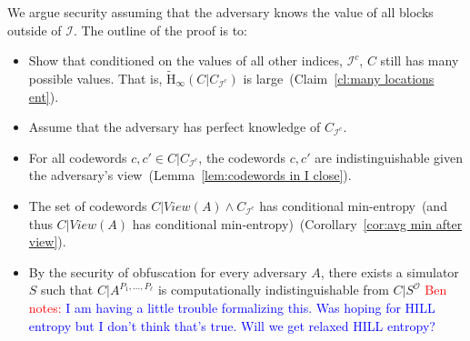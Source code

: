\documentclass[11pt]{article}
\newcommand{\corref}[1]{\mbox{Corollary~\ref{#1}}}
\newcommand{\lemref}[1]{\mbox{Lemma~\ref{#1}}}
\newcommand{\clref}[1]{\mbox{Claim~\ref{#1}}}
\newcommand{\Hav}{\tilde{\mathrm{H}}_\infty}
\newcommand{\authnote}[2]{{\textcolor{red}{\textsf{#1 notes: }\textcolor{blue}{ #2}}\marginpar{\textcolor{red}{\textbf{!!!!!}}}}}
\newcommand{\authnote}[2]{}
\newcommand{\bnote}[1]{{\authnote{Ben}{#1}}}
\begin{document}
\noindent We argue security assuming that the adversary knows the value of all blocks outside of $\mathcal{I}$.  The outline of the proof is to:

\begin{itemize}
\item Show that conditioned on the values of all other indices, $\mathcal{I}^c$, $C$ still has many possible values.  That is, $\Hav(C | C_{\mathcal{I}^c})$ is large~(\clref{cl:many locations ent}).
\item Assume that the adversary has perfect knowledge of $C_{\mathcal{I}^c}$.
\item For all codewords $c, c' \in C| C_{\mathcal{I}^c}$, the codewords $c, c'$ are indistinguishable given the adversary's view~(\lemref{lem:codewords in I close}).
\item The set of codewords $C| View(A) \wedge C_{\mathcal{I}^c}$ has conditional min-entropy~(and thus $C|View(A)$ has conditional min-entropy)~(\corref{cor:avg min after view}).  
\item By the security of obfuscation for every adversary $A$, there exists a simulator $S$ such that $C | A^{P_1,..., P_\ell}$ is computationally indistinguishable from $C | S^{\mathcal{O}}$%
\bnote{I am having a little trouble formalizing this.  Was hoping for HILL entropy but I don't think that's true.  Will we get relaxed HILL entropy?}
\end{itemize}
\end{document}
